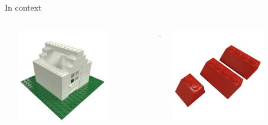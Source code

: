\begin{frame}{In context}
    \begin{columns}[c]
        \begin{column}{0.05\textwidth}
        \end{column}\begin{column}{0.3\textwidth}
            \centering
            \includegraphics[width=0.7\textwidth]{images/03_transformation_framework/lego_house_roofless.png}
        \end{column}\begin{column}{0.05\textwidth}
            \centering
            +
        \end{column}\begin{column}{0.2\textwidth}
            \centering
            \includegraphics[width=0.7\textwidth]{images/03_transformation_framework/lego_roof_pieces.png}

\end{column}
\end{columns}
\end{frame}
